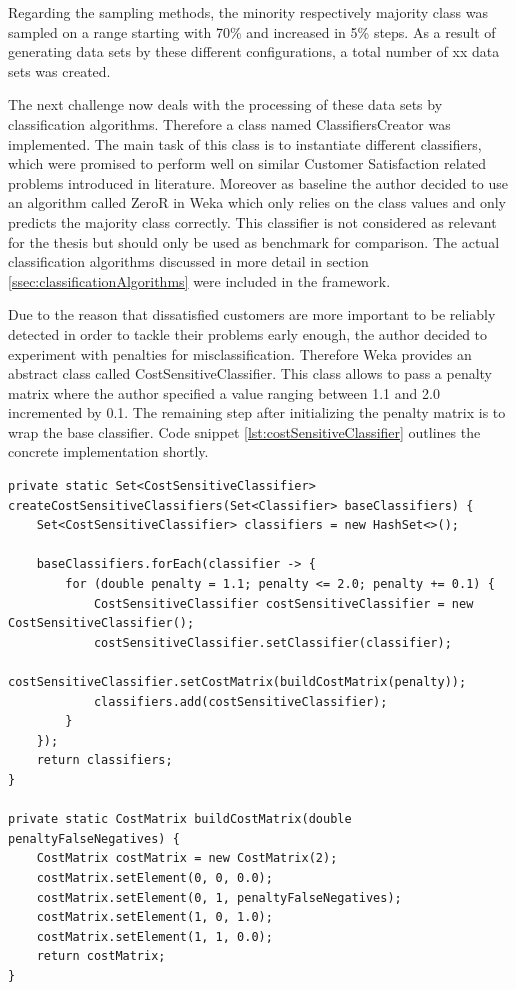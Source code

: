 Regarding the sampling methods, the minority respectively majority class was sampled on a range starting with 70\% and increased in 5\% steps. As a result of generating data sets by these different configurations, a total number of xx data sets was created. 

The next challenge now deals with the processing of these data sets by classification algorithms. Therefore a class named ClassifiersCreator was implemented. The main task of this class is to instantiate different classifiers, which were promised to perform well on similar Customer Satisfaction related problems introduced in literature. Moreover as baseline the author decided to use an algorithm called ZeroR in Weka which only relies on the class values and only predicts the majority class correctly. This classifier is not considered as relevant for the thesis but should only be used as benchmark for comparison. The actual classification algorithms discussed in more detail in section \ref{ssec:classificationAlgorithms} were included in the framework. 

Due to the reason that dissatisfied customers are more important to be reliably detected in order to tackle their problems early enough, the author decided to experiment with penalties for misclassification. Therefore Weka provides an abstract class called CostSensitiveClassifier. This class allows to pass a penalty matrix where the author specified a value ranging between 1.1 and 2.0 incremented by 0.1. The remaining step after initializing the penalty matrix is to wrap the base classifier. Code snippet \ref{lst:costSensitiveClassifier} outlines the concrete implementation shortly. 

\begin{lstlisting}[caption={DataSetCreator}, label={lst:dataSetCreator}]
private static Set<CostSensitiveClassifier> createCostSensitiveClassifiers(Set<Classifier> baseClassifiers) {
	Set<CostSensitiveClassifier> classifiers = new HashSet<>();
	
	baseClassifiers.forEach(classifier -> {
		for (double penalty = 1.1; penalty <= 2.0; penalty += 0.1) {
			CostSensitiveClassifier costSensitiveClassifier = new CostSensitiveClassifier();
			costSensitiveClassifier.setClassifier(classifier);
			costSensitiveClassifier.setCostMatrix(buildCostMatrix(penalty));
			classifiers.add(costSensitiveClassifier);
		}
	});
	return classifiers;
}

private static CostMatrix buildCostMatrix(double penaltyFalseNegatives) {
	CostMatrix costMatrix = new CostMatrix(2);
	costMatrix.setElement(0, 0, 0.0);
	costMatrix.setElement(0, 1, penaltyFalseNegatives);
	costMatrix.setElement(1, 0, 1.0);
	costMatrix.setElement(1, 1, 0.0);
	return costMatrix;
}
\end{lstlisting}

